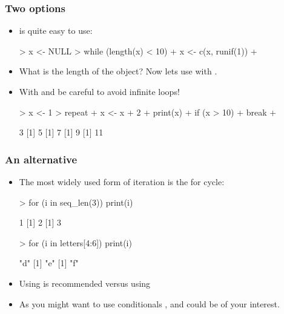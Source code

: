 \begin{frame}
  \frametitle{Two options}
  \begin{itemize}
  \item {} is quite easy to use: 
\begin{Schunk}
\begin{Sinput}
> x <- NULL
> while (length(x) < 10) {
+     x <- c(x, runif(1))
+ }
\end{Sinput}
\end{Schunk}
  \item What is the length of the  object? Now lets use  with .
  \item With  and  be careful to avoid \alert{infinite loops!}
\begin{Schunk}
\begin{Sinput}
> x <- 1
> repeat {
+     x <- x + 2
+     print(x)
+     if (x > 10) 
+         break
+ }
\end{Sinput}
\begin{Soutput}
[1] 3
[1] 5
[1] 7
[1] 9
[1] 11
\end{Soutput}
\end{Schunk}
  \end{itemize}
\end{frame}

\begin{frame}
  \frametitle{An alternative}
  \begin{itemize}
  \item The most widely used form of iteration is the \alert{for} cycle: 
\begin{Schunk}
\begin{Sinput}
> for (i in seq_len(3)) print(i)
\end{Sinput}
\begin{Soutput}
[1] 1
[1] 2
[1] 3
\end{Soutput}
\begin{Sinput}
> for (i in letters[4:6]) print(i)
\end{Sinput}
\begin{Soutput}
[1] "d"
[1] "e"
[1] "f"
\end{Soutput}
\end{Schunk}
  \item Using  is recommended versus using 
  \item As you might want to use conditionals ,  and  could be of your interest.
  \end{itemize}
\end{frame}

